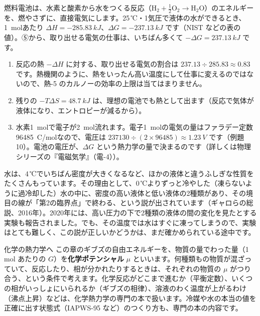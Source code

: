 燃料電池は、水素と酸素から水をつくる反応（$\mathrm{H_2}+\tfrac12\mathrm{O_2}\to\mathrm{H_2O}$）のエネルギーを、燃やさずに、直接電気にします。25\,℃・1気圧で液体の水ができるとき、\qty{1}{mol}あたり $\Delta H=\qty{-285.83}{kJ}$、$\Delta G=\qty{-237.13}{kJ}$ です（NIST などの表の値）。⑤から、取り出せる電気の仕事は、いちばん多くて $-\Delta G=\qty{237.13}{kJ}$ です。

\begin{enumerate}[label={\bkcircled{\arabic*}}, leftmargin=2.4\zw, itemsep=1pt, topsep=2pt]
\item 反応の熱 $-\Delta H$ に対する、取り出せる電気の割合は $237.13\div285.83\approx0.83$ です。熱機関のように、熱をいったん高い温度にして仕事に変えるのではないので、熱-5 のカルノーの効率の上限は当てはまりません。
\item 残りの $-T\Delta S=\qty{48.7}{kJ}$ は、理想の電池でも熱として出ます（反応で気体が液体になり、エントロピーが減るから）。
\item 水素\qty{1}{mol}で電子が\qty{2}{mol}流れます。電子\qty{1}{mol}の電気の量はファラデー定数\qty{96485}{C/mol}なので、電圧は $237130\div(2\times96485)\approx\qty{1.23}{V}$ です（例題10）。電池の電圧が、$\Delta G$ という熱力学の量で決まるのです（詳しくは物理シリーズの『電磁気学』（電-4））。
\end{enumerate}

\begin{phmada}
水は、4\,℃でいちばん密度が大きくなるなど、ほかの液体と違うふしぎな性質をたくさんもっています。その理由として、0\,℃よりずっと冷やした（凍らないように過冷却した）水の中に、密度の高い液体と低い液体の2種類があり、その境目の線が「第2の臨界点」で終わる、という説が出されています（ギャロらの総説、2016年）。2020年には、高い圧力の下で2種類の液体の間の変化を見たとする実験も報告されました。でも、その温度では水はすぐに凍ってしまうので、実験はとても難しく、この説が正しいかどうかは、まだ確かめられている途中です。
\end{phmada}

\begin{phsaki}{化学の熱力学へ}
この章のギブズの自由エネルギーを、物質の量でわった量（1 mol あたりの $G$）を\textbf{化学ポテンシャル} $\mu$ といいます。何種類もの物質が混ざっていて、反応したり、相が分かれたりするときは、それぞれの物質の $\mu$ がつり合う、という条件で考えます。化学反応がどこまで進むか（平衡定数）、いくつの相がいっしょにいられるか（ギブズの相律）、溶液のわく温度が上がるわけ（沸点上昇）などは、化学熱力学の専門の本で扱います。冷媒や水の本当の値を正確に出す状態式（IAPWS-95 など）のつくり方も、専門の本の内容です。
\end{phsaki}

